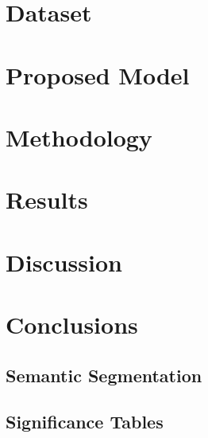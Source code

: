 \documentclass[pdftex]{pucthesis}	%
\begin{document}
\chapter[DATASET]{Dataset} \label{dataset}


\chapter[PROPOSED MODEL]{Proposed Model} \label{arch}


\chapter[METHODOLOGY]{Methodology} \label{methodology}


\chapter[RESULTS]{Results} \label{results}


\chapter[DISCUSSION]{Discussion} \label{discussion}


\chapter[CONCLUSIONS]{Conclusions} \label{conclusions}



\cleardoublepage
{} \label{references}

\renewcommand{\bibname}{REFERENCES}






\appendix %

\newpage
\section[Semantic Segmentation]{Semantic Segmentation}

\section[Significance Tables]{Significance Tables}\label{sec:sig_tables}

\end{document}
